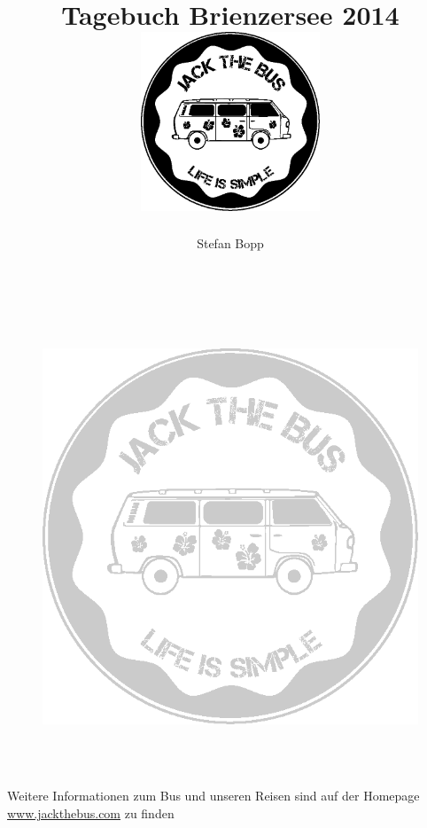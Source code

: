 \documentclass[11pt,nswissgerman]{article}
\begin{document}
\author{Stefan Bopp}
\title{\Huge Tagebuch Brienzersee 2014\vspace{2cm}
    \includegraphics[width=0.4\textwidth]{../Bilder/Logo/Logo.png}
}
\maketitle
\vfill
\tableofcontents

\newpage



\cfoot{\thepage}

\newpage

\begin{figure}[H]
        \centering
            \includegraphics[width=\textwidth,height=14cm, keepaspectratio]{../Bilder/Logo/Logo_trans.png}
                \label{img:Logo}
            \end{figure}
            \vfill
                \begin{center}
                            {\huge  Weitere Informationen zum Bus und unseren Reisen sind auf der Homepage {\url{www.jackthebus.com}} zu finden}
                        \end{center}

                        
\end{document}
